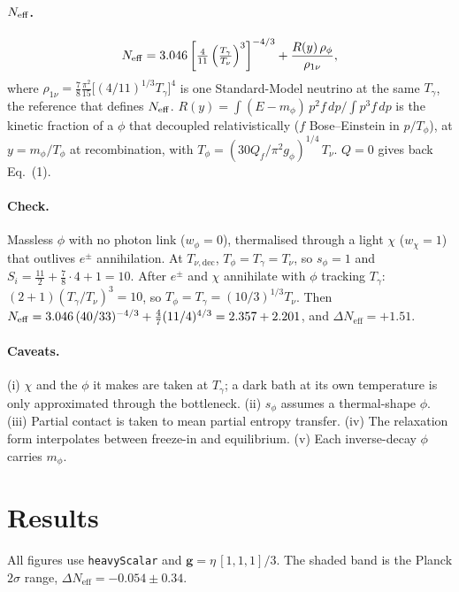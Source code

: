 \documentclass{article}
\newcommand{\dNeff}{\Delta N_{\mathrm{eff}}}
\newcommand{\Tnu}{T_{\nu,\mathrm{dec}}}
\begin{document}
\paragraph{$N_{\rm eff}$.}
\begin{equation}
  N_{\rm eff} = 3.046\left[\tfrac{4}{11}\left(\tfrac{T_\gamma}{T_\nu}\right)^3\right]^{-4/3}
  + \frac{R(y)\,\rho_\phi}{\rho_{1\nu}},
\end{equation}
where $\rho_{1\nu} = \tfrac78\tfrac{\pi^2}{15}\big[(4/11)^{1/3}T_\gamma\big]^4$ is one
Standard-Model neutrino at the same $T_\gamma$, the reference that defines
$N_{\rm eff}$. $R(y) = \int (E-m_\phi)\,p^2 f\,dp \big/ \int p^3 f\,dp$ is the
kinetic fraction of a $\phi$ that decoupled relativistically ($f$ Bose--Einstein in
$p/T_\phi$), at $y = m_\phi/T_\phi$ at recombination, with
$T_\phi = (30Q_f/\pi^2 g_\phi)^{1/4}\,T_\nu$. $Q = 0$ gives back Eq.~(1).

\paragraph{Check.} Massless $\phi$ with no photon link ($w_\phi=0$), thermalised
through a light $\chi$ ($w_\chi = 1$) that outlives $e^\pm$ annihilation. At $\Tnu$,
$T_\phi = T_\gamma = T_\nu$, so $s_\phi = 1$ and
$S_i = \tfrac{11}{2} + \tfrac78\cdot4 + 1 = 10$. After $e^\pm$ and $\chi$ annihilate
with $\phi$ tracking $T_\gamma$: $(2+1)(T_\gamma/T_\nu)^3 = 10$, so
$T_\phi = T_\gamma = (10/3)^{1/3}T_\nu$. Then
$N_{\rm eff} = 3.046\,(40/33)^{-4/3} + \tfrac47(11/4)^{4/3} = 2.357 + 2.201$, and
$\dNeff = +1.51$.

\paragraph{Caveats.}
(i) $\chi$ and the $\phi$ it makes are taken at $T_\gamma$; a dark bath at its own
temperature is only approximated through the bottleneck.
(ii) $s_\phi$ assumes a thermal-shape $\phi$.
(iii) Partial contact is taken to mean partial entropy transfer.
(iv) The relaxation form interpolates between freeze-in and equilibrium.
(v) Each inverse-decay $\phi$ carries $m_\phi$.

\section{Results}

All figures use \texttt{heavyScalar} and $\mathbf g = \eta\,[1,1,1]/3$. The shaded
band is the Planck $2\sigma$ range, $\dNeff = -0.054 \pm 0.34$.
\end{document}
